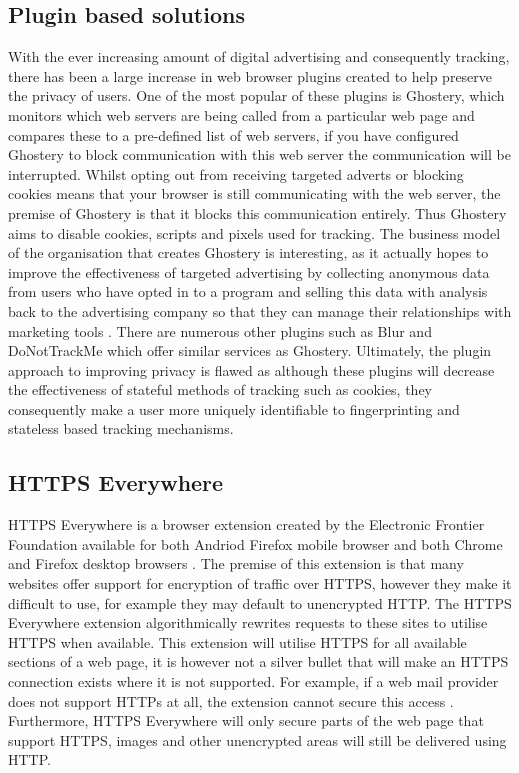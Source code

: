 \documentclass[12pt]{article}
\begin{document}
\subsection{Plugin based solutions}
With the ever increasing amount of digital advertising and consequently tracking, there has been a large increase in web browser plugins created to help preserve the privacy of users. One of the most popular of these plugins is Ghostery, which monitors which web servers are being called from a particular web page and compares these to a pre-defined list of web servers, if you have configured Ghostery to block communication with this web server the communication will be interrupted. Whilst opting out from receiving targeted adverts or blocking cookies means that your browser is still communicating with the web server, the premise of Ghostery is that it blocks this communication entirely. Thus Ghostery aims to disable cookies, scripts and pixels used for tracking. The business model of the organisation that creates Ghostery is interesting, as it actually hopes to improve the effectiveness of targeted advertising by collecting anonymous data from users who have opted in to a program and selling this data with analysis back to the advertising company so that they can manage their relationships with marketing tools \parencite{ghostery}. There are numerous other plugins such as Blur and DoNotTrackMe which offer similar services as Ghostery. Ultimately, the plugin approach to improving privacy is flawed as although these plugins will decrease the effectiveness of stateful methods of tracking such as cookies, they consequently make a user more uniquely identifiable to fingerprinting and stateless based tracking mechanisms.

\subsection{HTTPS Everywhere}
HTTPS Everywhere is a browser extension created by the Electronic Frontier Foundation available for both Andriod Firefox mobile browser and both Chrome and Firefox desktop browsers \parencite{httpsEverywhere}. The premise of this extension is that many websites offer support for encryption of traffic over HTTPS, however they make it difficult to use, for example they may default to unencrypted HTTP. The HTTPS Everywhere extension algorithmically rewrites requests to these sites to utilise HTTPS when available. This extension will utilise HTTPS for all available sections of a web page, it is however not a silver bullet that will make an HTTPS connection exists where it is not supported. For example, if a web mail provider does not support HTTPs at all, the extension cannot secure this access \parencite{httpsEverywhere}. Furthermore, HTTPS Everywhere will only secure parts of the web page that support HTTPS, images and other unencrypted areas will still be delivered using HTTP.  \\
\end{document}
